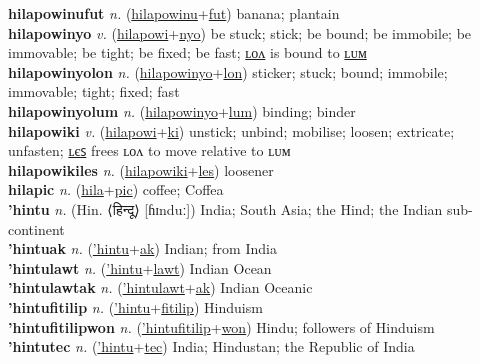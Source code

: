 \textbf{hilapowinufut} \textit{n.} (\hyperref[hilapowinu]{hilapowinu}+\hyperref[fut]{fut})
banana; plantain \label{hilapowinufut} \\
\textbf{hilapowinyo} \textit{v.} (\hyperref[hilapowi]{hilapowi}+\hyperref[nyo]{nyo})
be stuck; stick; be bound; be immobile; be immovable; be tight; be fixed; be fast; \hyperref[hilapowinyolon]{ʟᴏᴧ} is bound to \hyperref[hilapowinyolum]{ʟᴜᴍ} \label{hilapowinyo} \\
\textbf{hilapowinyolon} \textit{n.} (\hyperref[hilapowinyo]{hilapowinyo}+\hyperref[lon]{lon})
sticker; stuck; bound; immobile; immovable; tight; fixed; fast \label{hilapowinyolon} \\
\textbf{hilapowinyolum} \textit{n.} (\hyperref[hilapowinyo]{hilapowinyo}+\hyperref[lum]{lum})
binding; binder \label{hilapowinyolum} \\
\textbf{hilapowiki} \textit{v.} (\hyperref[hilapowi]{hilapowi}+\hyperref[ki]{ki})
unstick; unbind; mobilise; loosen; extricate; unfasten; \hyperref[hilapowikiles]{ʟєꜱ} frees ʟᴏᴧ to move relative to ʟᴜᴍ \label{hilapowiki} \\
\textbf{hilapowikiles} \textit{n.} (\hyperref[hilapowiki]{hilapowiki}+\hyperref[les]{les})
loosener \label{hilapowikiles} \\
\textbf{hilapic} \textit{n.} (\hyperref[hila]{hila}+\hyperref[pic]{pic})
coffee; Coffea \label{hilapic} \\
\textbf{'hintu} \textit{n.} (Hin. ⟨हिन्दू⟩ [ɦɪnduː])
India; South Asia; the Hind; the Indian sub-continent \label{'hintu} \\
\textbf{'hintuak} \textit{n.} (\hyperref['hintu]{'hintu}+\hyperref[ak]{ak})
Indian; from India \label{'hintuak} \\
\textbf{'hintulawt} \textit{n.} (\hyperref['hintu]{'hintu}+\hyperref[lawt]{lawt})
Indian Ocean \label{'hintulawt} \\
\textbf{'hintulawtak} \textit{n.} (\hyperref['hintulawt]{'hintulawt}+\hyperref[ak]{ak})
Indian Oceanic \label{'hintulawtak} \\
\textbf{'hintufitilip} \textit{n.} (\hyperref['hintu]{'hintu}+\hyperref[fitilip]{fitilip})
Hinduism \label{'hintufitilip} \\
\textbf{'hintufitilipwon} \textit{n.} (\hyperref['hintufitilip]{'hintufitilip}+\hyperref[won]{won})
Hindu; followers of Hinduism \label{'hintufitilipwon} \\
\textbf{'hintutec} \textit{n.} (\hyperref['hintu]{'hintu}+\hyperref[tec]{tec})
India; Hindustan; the Republic of India \label{'hintutec} \\
